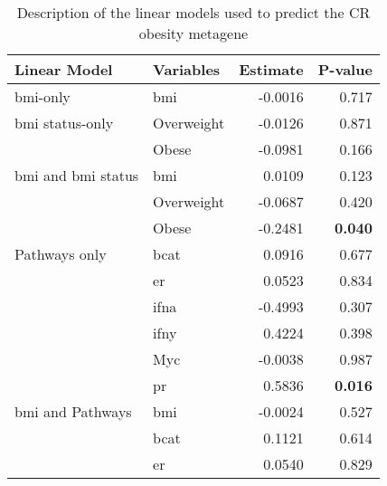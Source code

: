 \begin{table}[htpb]
	\centering
	\caption{Description of the linear models used to predict the CR obesity metagene}
	\label{tab:lm_sig_var}
	\begin{threeparttable}
		\begin{tabular}{llrr}
			Linear Model & Variables & Estimate & P-value\\
			\hline
			\hline
			\rule{0pt}{2.25ex}\gls{bmi}-only                           & \gls{bmi}  & -0.0016 & 0.717\\
			\hline
			\rule{0pt}{2.25ex}\gls{bmi} status-only                    & Overweight & -0.0126 & 0.871\\
                                                                       & Obese      & -0.0981 & 0.166\\
			\hline
			\rule{0pt}{2.25ex}\gls{bmi} and \gls{bmi} status           & \gls{bmi}  & 0.0109  & 0.123\\
                                                                       & Overweight & -0.0687 & 0.420\\
                                                                       & Obese      & -0.2481 & \textbf{0.040}\tnote{1}\\
			\hline
			\rule{0pt}{2.25ex}Pathways only                            & \gls{bcat} & 0.0916  & 0.677\\
                                                                       & \gls{er}   & 0.0523  & 0.834\\
                                                                       & \gls{ifna} & -0.4993 & 0.307\\
                                                                       & \gls{ifny} & 0.4224  & 0.398\\
                                                                       & Myc        & -0.0038 & 0.987\\
                                                                       & \gls{pr}   & 0.5836  & \textbf{0.016}\\
			\hline
			\rule{0pt}{2.25ex}\gls{bmi} and Pathways                   & \gls{bmi}  & -0.0024 & 0.527\\
                                                                       & \gls{bcat} & 0.1121  & 0.614\\
                                                                       & \gls{er}   & 0.0540  & 0.829\\

\end{tabular}
\end{threeparttable}
\end{table}
